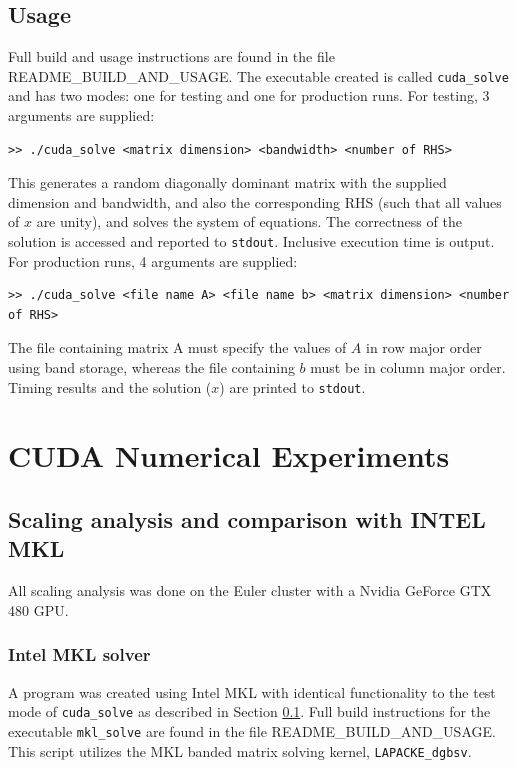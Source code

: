 \documentclass[12pt]{article}
\begin{document}
\subsection{Usage}
\label{usage}

Full build and usage instructions are found in
the file README\_BUILD\_AND\_USAGE. The executable created is called
\texttt{cuda\_solve} and has two modes: one for testing and one for production
runs. For testing, 3 arguments are supplied:

\begin{verbatim}
>> ./cuda_solve <matrix dimension> <bandwidth> <number of RHS> \end{verbatim}

This generates a random diagonally dominant matrix with the supplied dimension
and bandwidth, and also the corresponding RHS (such that all values of $x$ are
unity), and solves the system of equations. The correctness of the solution is
accessed and reported to \texttt{stdout}. Inclusive execution time is output. For production runs, 4
arguments are supplied:

\begin{verbatim}
>> ./cuda_solve <file name A> <file name b> <matrix dimension> <number of RHS>
\end{verbatim}

The file containing matrix A must specify the values of $A$ in row major order
using band storage, whereas the file containing $b$ must be in column major
order. Timing results and the solution ($x$) are printed to \texttt{stdout}.


\section{CUDA Numerical Experiments}
\label{sec:numericalexperiments}

\subsection{Scaling analysis and comparison with INTEL MKL}

All scaling analysis was done on the Euler cluster with a Nvidia GeForce GTX 480 GPU.

\subsubsection{Intel MKL solver}

A program was created using Intel MKL with identical functionality to the test
mode of \texttt{cuda\_solve} as described in Section \ref{usage}. Full build
instructions for the executable \texttt{mkl\_solve} are found in the file
README\_BUILD\_AND\_USAGE. This script utilizes the MKL banded matrix solving kernel,
\texttt{LAPACKE\_dgbsv}.
\end{document}
